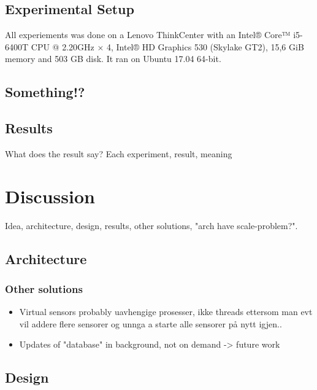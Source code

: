 \documentclass[USenglish]{uit-thesis}
\begin{document}
\section{Experimental Setup}
All experiements was done on a Lenovo ThinkCenter with an Intel® Core™ i5-6400T CPU @ 2.20GHz × 4, Intel® HD Graphics 530 (Skylake GT2), 15,6 GiB memory and 503 GB disk. It ran on Ubuntu 17.04 64-bit.

\section{Something!?}
\section{Results}
What does the result say?
Each experiment, result, meaning

\chapter{Discussion}
Idea, architecture, design, results, other solutions, "arch have scale-problem?".

\section{Architecture}
\subsection{Other solutions}
\begin{itemize}
\item Virtual sensors probably uavhengige prosesser, ikke threads ettersom man evt vil addere flere sensorer og unnga a starte alle sensorer på nytt igjen..
\item Updates of "database" in background, not on demand -> future work
\end{itemize}

\section{Design}
\end{document}
